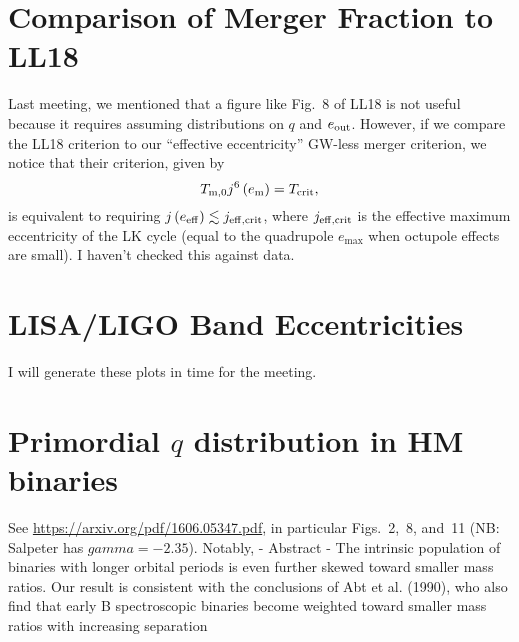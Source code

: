 \documentclass[11pt,
        usenames, %
        dvipsnames %
    ]{article}
\newcommand*{\p}[1]{\left(#1\right)}
\begin{document}
\section{Comparison of Merger Fraction to LL18}

Last meeting, we mentioned that a figure like Fig.~8 of LL18 is not useful
because it requires assuming distributions on $q$ and $e_{\rm out}$. However, if
we compare the LL18 criterion to our ``effective eccentricity'' GW-less merger
criterion, we notice that their criterion, given by
\begin{equation}
    T_{\rm m, 0}j^6\p{e_{\rm m}} = T_{\rm crit},
\end{equation}
is equivalent to requiring $j\p{e_{\rm eff}} \lesssim j_{\rm eff, crit}$, where
$j_{\rm eff, crit}$ is the effective maximum eccentricity of the LK cycle (equal
to the quadrupole $e_{\max}$ when octupole effects are small). I haven't checked
this against data.

\section{LISA/LIGO Band Eccentricities}

I will generate these plots in time for the meeting. %

\section{Primordial $q$ distribution in HM binaries}


See \url{https://arxiv.org/pdf/1606.05347.pdf}, in particular Figs.~2,~8, and~11
(NB\@: Salpeter has $gamma = -2.35$). Notably,
- Abstract
- The intrinsic population of binaries with longer orbital periods is even
  further skewed toward smaller mass ratios. Our result is consistent with the
  conclusions of Abt et al. (1990), who also find that early B spectroscopic
  binaries become weighted toward smaller mass ratios with increasing separation
\end{document}
